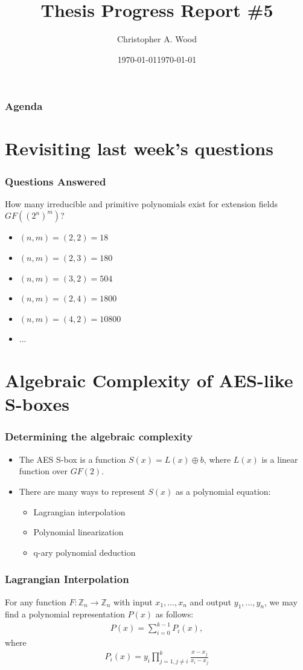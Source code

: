 \documentclass[handout]{beamer}
\title[Thesis Progress Report \#5]{Thesis Progress Report \#5}
\institute[RIT]{}
\date{\today}
\author{Christopher A. Wood}
\date{\today}
\begin{document}

\begin{frame}
	\titlepage
\end{frame}

\begin{frame}
	\frametitle{Agenda}
	\tableofcontents
\end{frame}

\section{Revisiting last week's questions}
\begin{frame}
	\frametitle{Questions Answered}
	How many irreducible and primitive polynomials exist for extension fields $GF((2^n)^m)$?
	\begin{itemize}
		\item $(n,m) = (2,2) = 18$
		\item $(n,m) = (2,3) = 180$
		\item $(n,m) = (3,2) = 504$
		\item $(n,m) = (2,4) = 1800$
		\item $(n,m) = (4,2) = 10800$
		\item ...
	\end{itemize}
\end{frame}

\section{Algebraic Complexity of AES-like S-boxes}
\begin{frame}
	\frametitle{Determining the algebraic complexity}
	\begin{itemize}
		\item The AES S-box is a function $S(x) = L(x) \oplus b$, where $L(x)$ is a linear
		function over $GF(2)$.
		\item There are many ways to represent $S(x)$ as a polynomial equation:
		\begin{itemize}
			\item Lagrangian interpolation
			\item Polynomial linearization
			\item q-ary polynomial deduction
		\end{itemize}
	\end{itemize}
\end{frame}

\begin{frame}
	\frametitle{Lagrangian Interpolation}
	For any function $F : \mathbb{Z}_n \to \mathbb{Z}_n$ with input $x_1,\dots,x_n$ and output $y_1,\dots,y_n$, we may 
	find a polynomial representation $P(x)$ as follows: 
	\begin{align*}
P(x) = \sum_{i = 0}^{k-1}P_i(x),
	\end{align*}
	where
	\begin{align*}
P_i(x) = y_i \prod_{j=1, j\not=i}^{k} \frac{x - x_j}{x_i - x_j}
	\end{align*}
\end{frame}
\end{document}
